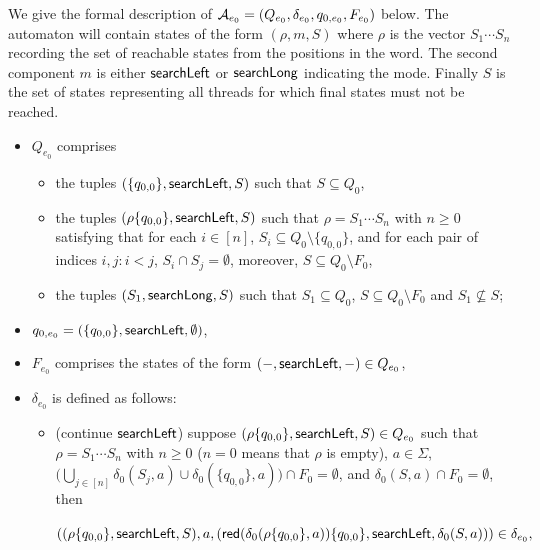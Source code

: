 We give the formal description of $\mathcal{A}_{e_0}=(Q_{e_0}, \delta_{e_0}, q_{0,e_0}, F_{e_0})$ below.
The automaton will contain states of the form $(\rho, m, S)$ where $\rho$ is the vector $S_1\cdots S_n$ recording the set of reachable states from the positions in the word.
The second component $m$ is either $\mathsf{searchLeft}$ or $\mathsf{searchLong}$ indicating the mode.
Finally $S$ is the set of states representing all threads for which final states must not be reached.
\begin{itemize}
	\item $Q_{e_0}$ comprises 
	\begin{itemize}
		\item the tuples $(\{q_{0,0}\}, \mathsf{searchLeft}, S)$ such that $S \subseteq Q_0$,
		\item the tuples $(\rho \{q_{0,0}\}, \mathsf{searchLeft}, S)$ such that  $\rho = S_1 \cdots S_n$ with $n \ge 0$ satisfying that for each $i \in [n]$, $S_i \subseteq Q_0 \setminus \{q_{0,0}\}$, and for each pair of indices $i, j: i < j$, $S_i \cap S_j = \emptyset$, moreover, $S \subseteq Q_0 \setminus F_0$, 
		\item the tuples $(S_1, \mathsf{searchLong}, S)$ such that $S_1 \subseteq Q_0$, $S \subseteq Q_0 \setminus F_0$ and $S_1 \not \subseteq S$;
	\end{itemize}
	\item $q_{0,e_0}= (\{q_{0,0}\}, \mathsf{searchLeft}, \emptyset)$,
	\item $F_{e_0}$ comprises the states of the form $(-, \mathsf{searchLeft}, -) \in Q_{e_0}$,
	\item $\delta_{e_0}$ is defined as follows: 
	\begin{itemize}
		\item (continue $\mathsf{searchLeft}$) suppose $(\rho \{q_{0,0}\}, \mathsf{searchLeft}, S) \in Q_{e_0}$ such that $\rho = S_1 \cdots S_n$ with $n \ge 0$  ($n = 0$ means that $\rho$ is empty), $a \in \Sigma$, $\big(\bigcup \limits_{j \in [n]} \delta_0(S_j, a) \cup \delta_0(\{q_{0,0}\},a)\big) \cap F_0 = \emptyset$, and $\delta_0(S,a) \cap F_0 = \emptyset$, then 
		\medskip
		
		\hspace{5mm} $\left((\rho  \{q_{0,0}\}, \mathsf{searchLeft}, S), a, \left(\mathsf{red}(\delta_0(\rho\{q_{0,0}\}, a)) \{q_{0,0}\}, \mathsf{searchLeft}, \delta_0(S,a) \right) \right) \in \delta_{e_0},$
		

\end{itemize}
\end{itemize}
